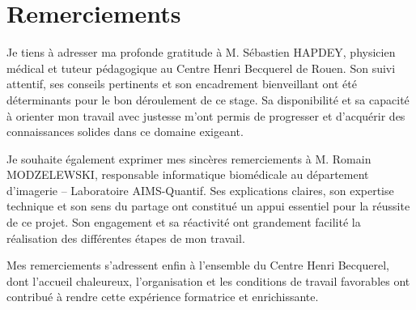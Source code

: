 \documentclass[12pt,a4paper]{report}
\begin{document}


\newpage

\chapter*{Remerciements}

Je tiens à adresser ma profonde gratitude à M. Sébastien HAPDEY, physicien médical et tuteur pédagogique au Centre Henri Becquerel de Rouen. Son suivi attentif, ses conseils pertinents et son encadrement bienveillant ont été déterminants pour le bon déroulement de ce stage. Sa disponibilité et sa capacité à orienter mon travail avec justesse m'ont permis de progresser et d'acquérir des connaissances solides dans ce domaine exigeant.

Je souhaite également exprimer mes sincères remerciements à M. Romain MODZELEWSKI, responsable informatique biomédicale au département d'imagerie – Laboratoire AIMS-Quantif. Ses explications claires, son expertise technique et son sens du partage ont constitué un appui essentiel pour la réussite de ce projet. Son engagement et sa réactivité ont grandement facilité la réalisation des différentes étapes de mon travail.

Mes remerciements s'adressent enfin à l'ensemble du Centre Henri Becquerel, dont l'accueil chaleureux, l'organisation et les conditions de travail favorables ont contribué à rendre cette expérience formatrice et enrichissante.

\tableofcontents
\newpage
\end{document}
